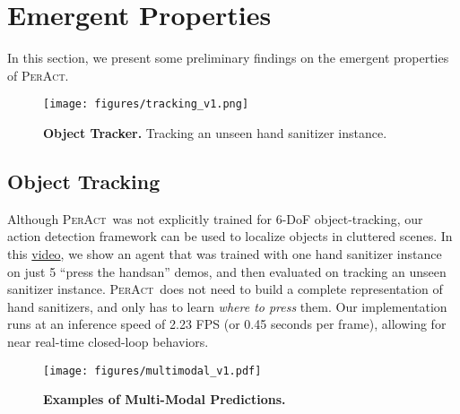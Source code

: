 \documentclass{article}
\newcommand{\model}{\textsc{PerAct}}
\begin{document}
\section{Emergent Properties}

In this section, we present some preliminary  findings on the emergent properties of \model.

\begin{wrapfigure}{r}{0.40\textwidth}
  \vspace{-1.3cm}
  \begin{center}
    \texttt{[image: figures/tracking\_v1.png]}
  \caption{\textbf{Object Tracker.} Tracking  an unseen hand sanitizer instance.}
  \label{fig:tracking}
  \end{center}
\end{wrapfigure}
\subsection{Object Tracking}
Although \model~was not explicitly trained for 6-DoF object-tracking, our action detection framework can be used to localize objects in cluttered scenes. In this \href{https://peract.github.io/media/results/animations/handsan_tracking_v2.mp4}{video}, we show  an agent that was trained with one hand sanitizer instance on just 5 ``press the handsan'' demos, and then evaluated on tracking an unseen sanitizer instance. \model~does not need to build a complete representation of hand sanitizers, and only has to learn \textit{where to press} them. Our implementation runs at an inference speed of 2.23 FPS (or 0.45 seconds per frame), allowing for near real-time closed-loop behaviors. 

\begin{wrapfigure}{r}{0.40\textwidth}
  \vspace{-2.9cm}
  \begin{center}
    \texttt{[image: figures/multimodal\_v1.pdf]}
  \caption{\textbf{Examples of Multi-Modal Predictions.}}
  \label{fig:multimodal}
  \end{center}
  \vspace{-1cm}
\end{wrapfigure}

\vspace{1cm}
\end{document}
